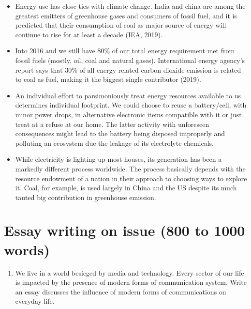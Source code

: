 \documentclass[
  openany]{book}
\providecommand{\tightlist}{%
  \setlength{\itemsep}{0pt}\setlength{\parskip}{0pt}}
\begin{document}
\begin{itemize}
\tightlist
\item
  Energy use has close ties with climate change. India and china are among the greatest emitters of greenhouse gases and consumers of fossil fuel, and it is predicted that their consumption of coal as major source of energy will continue to rise for at least a decade (IEA, 2019).
\item
  Into 2016 and we still have 80\% of our total energy requirement met from fossil fuels (mostly, oil, coal and natural gases). International energy agency's report says that 30\% of all energy-related carbon dioxide emission is related to coal as fuel, making it the biggest single contributor (2019).
\item
  An individual effort to parsimoniously treat energy resources available to us determines individual footprint. We could choose to reuse a battery/cell, with minor power drops, in alternative electronic items compatible with it or just treat at a refuse at our home. The latter activity with unforeseen consequences might lead to the battery being disposed improperly and polluting an ecosystem due the leakage of its electrolyte chemicals.
\item
  While electricity is lighting up most houses, its generation has been a markedly different process worldwide. The process basically depends with the resource endowment of a nation in their approach to choosing ways to explore it. Coal, for example, is used largely in China and the US despite its much tauted big contribution in greenhouse emission.
\end{itemize}

\hypertarget{essay-writing-on-issue-800-to-1000-words}{%
\section{Essay writing on issue (800 to 1000 words)}\label{essay-writing-on-issue-800-to-1000-words}}

\begin{enumerate}
\def\labelenumi{\arabic{enumi}.}
\tightlist
\item
  We live in a world besieged by media and technology. Every sector of our life is impacted by the presence of modern forms of communication system. Write an essay discusses the influence of modern forms of communications on everyday life.
\end{enumerate}
\end{document}
